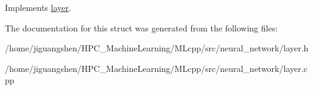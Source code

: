 Implements \hyperlink{structlayer_aacf7297d77c1ea2933d5551636f7c9ad}{layer}.



The documentation for this struct was generated from the following files\-:\begin{DoxyCompactItemize}
\item 
/home/jiguangshen/\-H\-P\-C\-\_\-\-Machine\-Learning/\-M\-Lcpp/src/neural\-\_\-network/layer.\-h\item 
/home/jiguangshen/\-H\-P\-C\-\_\-\-Machine\-Learning/\-M\-Lcpp/src/neural\-\_\-network/layer.\-cpp\end{DoxyCompactItemize}

